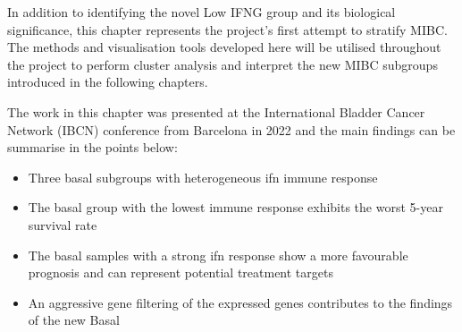 In addition to identifying the novel Low IFNG group and its biological significance, this chapter represents the project's first attempt to stratify MIBC. The methods and visualisation tools developed here will be utilised throughout the project to perform cluster analysis and interpret the new MIBC subgroups introduced in the following chapters.


The work in this chapter was presented at the International Bladder Cancer Network (IBCN) conference from Barcelona in 2022 and the main findings can be summarise in the points below:

\begin{itemize}
    \item Three basal subgroups with heterogeneous \acrfull{ifn} immune response
    \item The basal group with the lowest immune response exhibits the worst 5-year survival rate
    \item The basal samples with a strong \acrshort{ifn} response show a more favourable prognosis and can represent potential treatment targets
    \item An aggressive gene filtering of the expressed genes contributes to the findings of the new Basal 
\end{itemize}